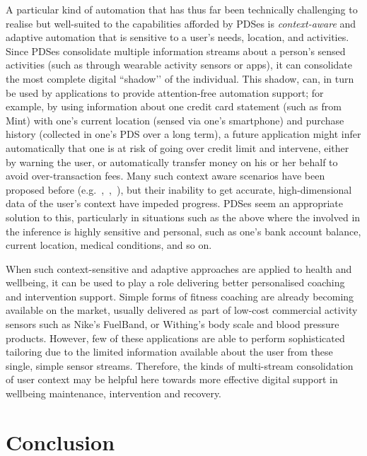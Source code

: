 \documentclass[graybox]{svmult}
\begin{document}
A particular kind of automation that has thus far been technically challenging to realise but well-suited to the capabilities afforded by PDSes is \emph{context-aware} and adaptive automation that is sensitive to a user’s needs, location, and activities.  Since PDSes consolidate multiple information streams about a person’s sensed activities (such as through wearable activity sensors or apps),  it can consolidate the most complete digital ``shadow’’ of the individual.  This shadow, can, in turn be used by applications to provide attention-free automation support; for example, by using information about one credit card statement (such as from Mint) with one’s current location (sensed via one’s smartphone) and purchase history (collected in one’s PDS over a long term), a future application might infer automatically that one is at risk of going over credit limit and intervene, either by warning the user, or automatically transfer money on his or her behalf to avoid over-transaction fees.  Many such context aware scenarios have been proposed before (e.g.~\cite{selker2000context},~\cite{schilit1994context},~\cite{dey2001understanding}), but their inability to get accurate, high-dimensional data of the user’s context have impeded progress.  PDSes seem an appropriate solution to this, particularly in situations such as the above where the involved in the inference is highly sensitive and personal, such as one’s bank account balance, current location, medical conditions, and so on. 

When such context-sensitive and adaptive approaches are applied to health and wellbeing, it can be used to play a role delivering better personalised coaching and intervention support.  Simple forms of fitness coaching are already becoming available on the market, usually delivered as part of low-cost commercial activity sensors such as Nike’s FuelBand, or Withing’s body scale and blood pressure products. However, few of these applications are able to perform sophisticated tailoring due to the limited information available about the user from these single, simple sensor streams.  Therefore, the kinds of multi-stream consolidation of user context may be helpful here towards more effective digital support in wellbeing maintenance, intervention and recovery.

\section{Conclusion}
\end{document}
